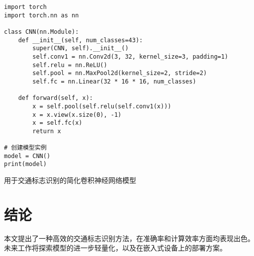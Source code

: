 \documentclass[
  oneside,
  fullwidthstop=false,
  fontset=fandol,
  times=false,
  minted=true,
]{tongjithesis}
\begin{document}
\begin{listing}
\begin{verbatim}
import torch
import torch.nn as nn

class CNN(nn.Module):
    def __init__(self, num_classes=43):
        super(CNN, self).__init__()
        self.conv1 = nn.Conv2d(3, 32, kernel_size=3, padding=1)
        self.relu = nn.ReLU()
        self.pool = nn.MaxPool2d(kernel_size=2, stride=2)
        self.fc = nn.Linear(32 * 16 * 16, num_classes)
    
    def forward(self, x):
        x = self.pool(self.relu(self.conv1(x)))
        x = x.view(x.size(0), -1)
        x = self.fc(x)
        return x

# 创建模型实例
model = CNN()
print(model)
\end{verbatim}
\caption{用于交通标志识别的简化卷积神经网络模型}
\label{listing:cnn}
\end{listing}


\section{结论}

本文提出了一种高效的交通标志识别方法，在准确率和计算效率方面均表现出色。
未来工作将探索模型的进一步轻量化，以及在嵌入式设备上的部署方案。
\end{document}
